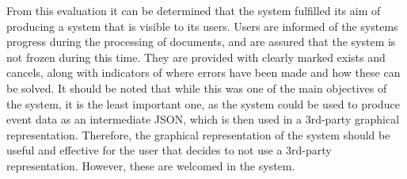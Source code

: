 \par From this evaluation it can be determined that the system fulfilled its aim of producing a system that is visible to its users. Users are informed of the systems progress during the processing of documents, and are assured that the system is not frozen during this time. They are provided with clearly marked exists and cancels, along with indicators of where errors have been made and how these can be solved. It should be noted that while this was one of the main objectives of the system, it is the least important one, as the system could be used to produce event data as an intermediate JSON, which is then used in a 3rd-party graphical representation. Therefore, the graphical representation of the system should be useful and effective for the user that decides to not use a 3rd-party representation. However, these are welcomed in the system.
